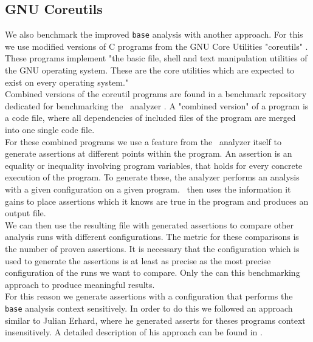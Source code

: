     \subsection{GNU Coreutils}\label{sec:benchCoreutils}
      We also benchmark the improved \texttt{base} analysis with another approach. For this we use modified versions of C programs from the GNU Core Utilities "coreutils" \parencite{gnuCoreutils}. These programs implement "the basic file, shell and text manipulation utilities of the GNU operating system. These are the core utilities which are expected to exist on every operating system."\parencite{gnuCoreutils}\\
      Combined versions of the coreutil programs are found in a benchmark repository dedicated for benchmarking the \gob\ analyzer \parencite{goblintBench}. A "combined version" of a program is a code file, where all dependencies of included files of the program are merged into one single code file.\\
      For these combined programs we use a feature from the \gob\ analyzer itself to generate assertions at different points within the program. An assertion is an equality or inequality involving program variables, that holds for every concrete execution of the program. To generate these, the analyzer performs an analysis with a given configuration on a given program. \gob\ then uses the information it gains to place assertions which it knows are true in the program and produces an output file.\\
      We can then use the resulting file with generated assertions to compare other analysis runs with different configurations. The metric for these comparisons is the number of proven assertions. It is necessary that the configuration which is used to generate the assertions is at least as precise as the most precise configuration of the runs we want to compare. Only the can this benchmarking approach to produce meaningful results.\\
      For this reason we generate assertions with a configuration that performs the \texttt{base} analysis context sensitively. In order to do this we followed an approach similar to Julian Erhard, where he generated asserts for theses programs context insensitively. A detailed description of his approach can be found in \parencite{svBenchCoreutils}.\\
      \\
